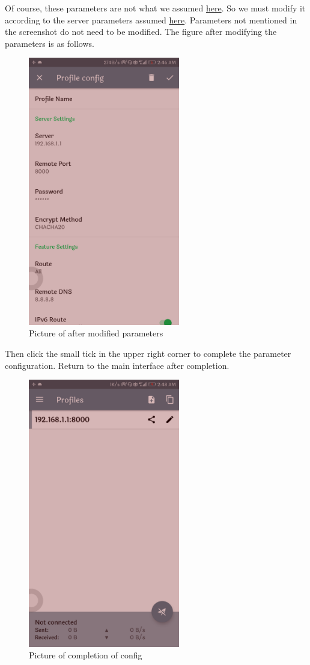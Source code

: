 \documentclass[12pt]{wx672article}
\begin{document}
\begin{itemize}
Of course, these parameters are not what we assumed \hyperref[org78958ea]{here}. So we must modify it according
to the server parameters assumed \hyperref[org78958ea]{here}. Parameters not mentioned in the screenshot do not
need to be modified. The figure after modifying the parameters is as follows.
\begin{figure}[!htb]
\centering
\includegraphics[width=250px]{./images/androidPhone4.jpg}
\caption{\label{fig:org381ae46}
Picture of after modified parameters}
\end{figure}

Then click the small tick in the upper right corner to complete the parameter
configuration. Return to the main interface after completion.
\begin{figure}[!htb]
\centering
\includegraphics[width=250px]{./images/androidPhone5.jpg}
\caption{\label{fig:orgcae9b03}
Picture of completion of config}
\end{figure}


\end{itemize}
\end{document}
